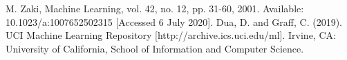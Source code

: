 \begin{thebibliography}{00}
     M. Zaki, Machine Learning, vol. 42, no. 12, pp. 31-60, 2001. Available: 10.1023/a:1007652502315 [Accessed 6 July 2020].
     Dua, D. and Graff, C. (2019). UCI Machine Learning Repository [http://archive.ics.uci.edu/ml]. Irvine, CA: University of California, School of Information and Computer Science.
\end{thebibliography}